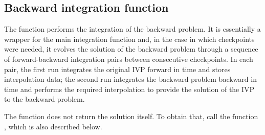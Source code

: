 \subsection{Backward integration function}
\label{sss:idasolveb}

The function  performs the integration of the backward problem.
It is essentially a wrapper for the {\idas} main integration function 
 and, in the case in which checkpoints were needed, it evolves 
the solution of the backward problem through a sequence of forward-backward 
integration pairs between consecutive checkpoints. 
In each pair, the first run integrates the original IVP forward in time and
stores interpolation data; the second run integrates the backward problem 
backward in time and performs the required interpolation to provide
the solution of the IVP to the backward problem.

The function  does not return the solution 
itself.  To obtain that, call the function , which is
also described below.

